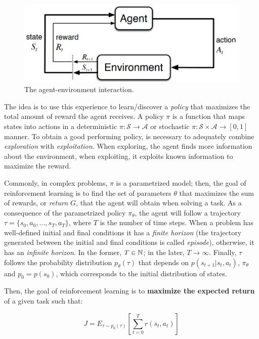 \begin{figure}[h]
    \centering
    \includegraphics[width=0.7\linewidth]{imagenes/cap1/agent_environment.png}
    \caption{The agent-environment interaction.}
    \label{fig:agent-environment}
\end{figure}

The idea is to use this experience to learn/discover a \emph{policy} that maximizes the total amount of reward the agent receives. A policy $\pi$ is a function that maps states into actions in a deterministic $\pi: \mathcal{S} \to \mathcal{A}$ or stochastic $\pi: \mathcal{S} \times \mathcal{A} \to [0,1]$ manner. To obtain a good performing policy, is necessary to adequately combine \emph{exploration} with \emph{exploitation}. When exploring, the agent finds more information about the environment, when exploiting, it exploits known information to maximize the reward.

Commonly, in complex problems, $\pi$ is a parametrized model; then, the goal of reinforcement learning is to find the set of parameters $\theta$ that maximizes the sum of rewards, or \emph{return} $G$, that the agent will obtain when solving a task. As a consequence of the parametrized policy $\pi_{\theta}$, the agent will follow a trajectory $\tau = \{s_{0}, a_{0},...,s_{T}, a_{T}\}$, where $T$ is the number of time steps. When a problem has well-defined initial and final conditions it has a \emph{finite horizon} (the trajectory generated between the initial and final conditions is called \emph{episode}), otherwise, it has an \emph{infinite horizon}. In the former, $T \in \mathbb{N}$; in the later, $T \to \infty$. Finally, $\tau$ follows the probability distribution $p_{\theta}(\tau)$ that depends on $p(s_{t+1}|s_{t}, a_{t})$, $\pi_{\theta}$ and $p_{0}=p(s_{0})$, which corresponds to the initial distribution of states.

Then, the goal of reinforcement learning is to \textbf{maximize the expected return} of a given task such that:

\begin{equation}
    J = E_{\tau \sim p_{\theta}(\tau)} \left[\sum_{t=0}^{T}r(s_{t}, a_{t})\right]
\end{equation}

